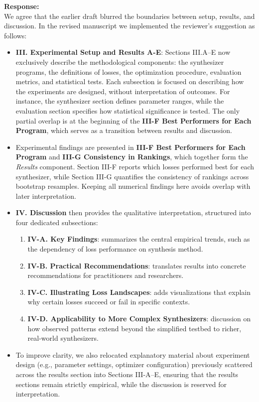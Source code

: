 \documentclass[11pt]{article}
\begin{document}
\noindent\textbf{Response:} \\
We agree that the earlier draft blurred the boundaries between setup, results, and discussion. In the revised manuscript we implemented the reviewer’s suggestion as follows:

\begin{itemize}
  \item \textbf{III. Experimental Setup and Results A-E}: Sections III.A–E now exclusively describe the methodological components: the synthesizer programs, the definitions of losses, the optimization procedure, evaluation metrics, and statistical tests. Each subsection is focused on describing how the experiments are designed, without interpretation of outcomes. For instance, the synthesizer section defines parameter ranges, while the evaluation section specifies how statistical significance is tested. The only partial overlap is at the beginning of the \textbf{III-F Best Performers for Each Program}, which serves as a transition between results and discussion.

  \item Experimental findings are presented in \textbf{III-F Best Performers for Each Program} and \textbf{III-G Consistency in Rankings}, which together form the \emph{Results} component. Section III-F reports which losses performed best for each synthesizer, while Section III-G quantifies the consistency of rankings across bootstrap resamples. Keeping all numerical findings here avoids overlap with later interpretation.  

  \item \textbf{IV. Discussion} then provides the qualitative interpretation, structured into four dedicated subsections:  
    \begin{enumerate}
      \item \textbf{IV-A. Key Findings}: summarizes the central empirical trends, such as the dependency of loss performance on synthesis method.  
      \item \textbf{IV-B. Practical Recommendations}: translates results into concrete recommendations for practitioners and researchers.  
      \item \textbf{IV-C. Illustrating Loss Landscapes}: adds visualizations that explain why certain losses succeed or fail in specific contexts.  
      \item \textbf{IV-D. Applicability to More Complex Synthesizers}: discussion on how observed patterns extend beyond the simplified testbed to richer, real-world synthesizers.  
    \end{enumerate}

  \item To improve clarity, we also relocated explanatory material about experiment design (e.g., parameter settings, optimizer configuration) previously scattered across the results section into Sections III-A–E, ensuring that the results sections remain strictly empirical, while the discussion is reserved for interpretation. 
\end{itemize}
\end{document}
